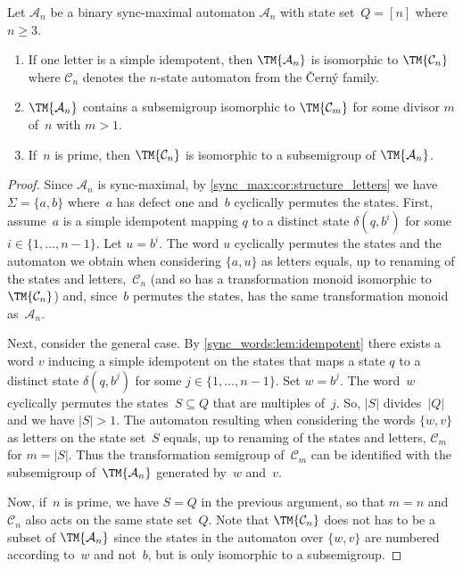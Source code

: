 \begin{proposition} \label{prop:binary-sync}
	Let $\mathcal A_n$ be a binary sync-maximal automaton $\mathcal A_n$ with state set~$Q = [n]$ where $n \ge 3$.
	
	\begin{enumerate}
		\item If one letter is a simple idempotent,
		then $\TM{\mathcal A_n}$ is isomorphic to $\TM{\mathcal C_n}$
		where $\mathcal C_n$ denotes the $n$-state automaton from the \v{C}ern\'y family.
		
		\item $\TM{\mathcal A_n}$ contains a subsemigroup isomorphic
		to $\TM{\mathcal C_m}$ for some divisor $m$ of~$n$ with $m > 1$.
		
		\item If~$n$ is prime, then $\TM{\mathcal C_n}$ is isomorphic to a subsemigroup of $\TM{\mathcal A_n}$.
	\end{enumerate}
\end{proposition}
\begin{proof}
	Since $\mathcal A_n$ is sync-maximal, by \cref{sync_max:cor:structure_letters}
	we have $\Sigma = \{a,b\}$ where~$a$ has defect one
	and~$b$ cyclically permutes the states.
	First, assume~$a$ is a simple idempotent
	mapping $q$ to a distinct state $\delta(q, b^i)$ for some $i \in \{1,\ldots,n-1\}$.
	Let $u = b^i$. The word $u$ cyclically permutes the states
	and the automaton we obtain when considering $\{a,u\}$
	as letters equals, up to renaming of the states and letters,~$\mathcal C_n$ (and so has a transformation monoid isomorphic to~$\TM{\mathcal C_n}$)
	and, since~$b$ permutes the states, has the same transformation monoid as~$\mathcal A_n$.
		
	Next, consider the general case. By \cref{sync_words:lem:idempotent} 
	there exists a word $v$ inducing a simple idempotent on the states
	that maps a state $q$ to a distinct state $\delta(q, b^j)$ for some $j \in \{1,\ldots,n-1\}$.
	Set $w = b^j$. The word~$w$ cyclically permutes the states~$S \subseteq Q$
	that are multiples of~$j$. So, $|S|$ divides~$|Q|$ and we have $|S| > 1$.
	The automaton resulting when considering the words $\{w, v\}$
	as letters on the state set~$S$
	equals, up to renaming of the states and letters, $\mathcal C_m$
	for $m = |S|$.
	Thus the transformation semigroup of~$\mathcal C_m$
	can be identified with the subsemigroup of~$\TM{\mathcal A_n}$
	generated by~$w$ and~$v$.
		
	Now, if~$n$ is prime, we have $S = Q$ in the previous argument, 
	so that $m = n$ and $\mathcal C_n$
	also acts on the same state set~$Q$.
	Note that $\TM{\mathcal C_n}$
	does not has to be a subset of $\TM{\mathcal A_n}$
	since the states in the automaton over $\{w,v\}$
	are numbered according to~$w$ and not~$b$,
	but is only isomorphic to a subsemigroup.
\end{proof}

